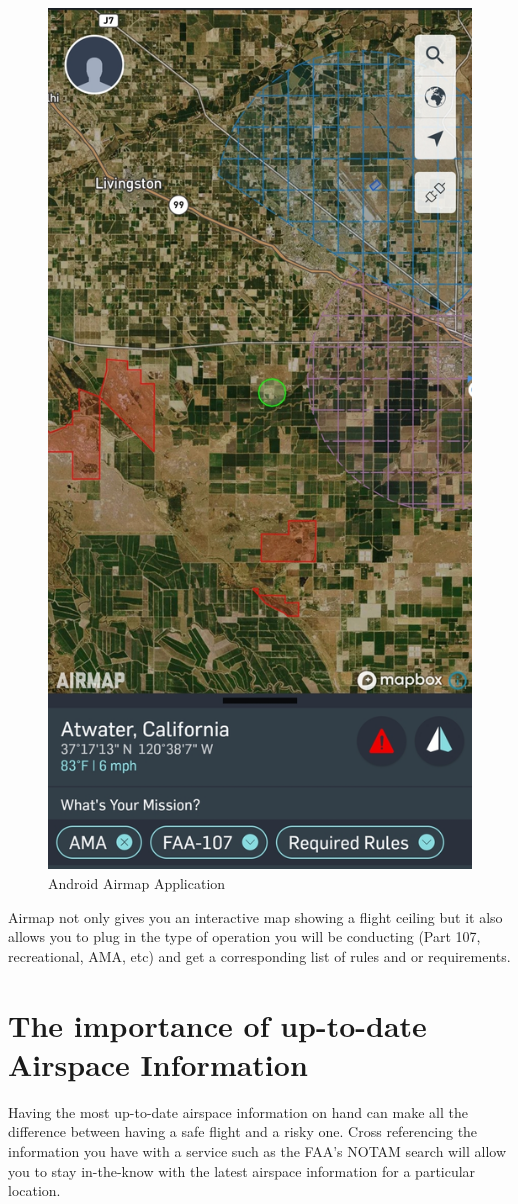 \documentclass[
]{book}
\begin{document}
\begin{figure}

{\centering \includegraphics[width=0.5\linewidth]{images/Airmap-Android} 

}

\caption{Android Airmap Application}\label{fig:airmap}
\end{figure}

Airmap not only gives you an interactive map showing a flight ceiling but it also allows you to plug in the type of operation you will be conducting (Part 107, recreational, AMA, etc) and get a corresponding list of rules and or requirements.

\hypertarget{the-importance-of-up-to-date-airspace-information}{%
\section{The importance of up-to-date Airspace Information}\label{the-importance-of-up-to-date-airspace-information}}

Having the most up-to-date airspace information on hand can make all the difference between having a safe flight and a risky one. Cross referencing the information you have with a service such as the FAA's NOTAM search will allow you to stay in-the-know with the latest airspace information for a particular location.
\end{document}
